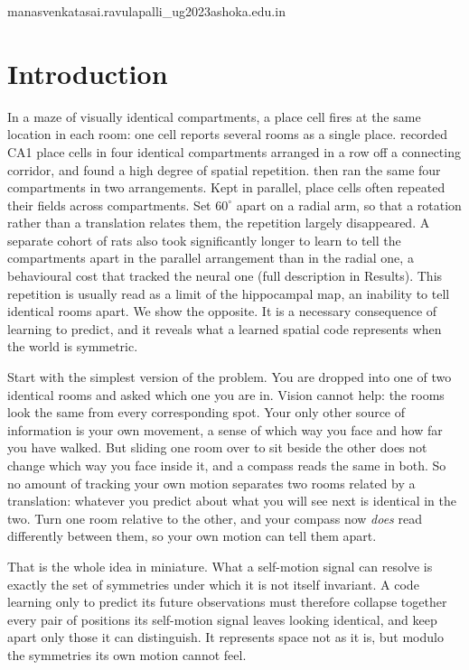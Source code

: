 \begin{corrauthor}
manasvenkatasai.ravulapalli\_ug2023\at ashoka.edu.in
\end{corrauthor}

\section*{Introduction}

In a maze of visually identical compartments, a place cell fires at the same location in each room:
one cell reports several rooms as a single place. \citet{spiers2015} recorded CA1 place cells in
four identical compartments arranged in a row off a connecting corridor, and found a high degree of
spatial repetition. \citet{grieves2016} then ran the same four compartments in two arrangements.
Kept in parallel, place cells often repeated their fields across compartments. Set $60^\circ$ apart
on a radial arm, so that a rotation rather than a translation relates them, the repetition largely
disappeared. A separate cohort of rats also took significantly longer to learn to tell the
compartments apart in the parallel arrangement than in the radial one, a behavioural cost that tracked
the neural one (full description in Results). This repetition is usually read as a limit of the
hippocampal map, an inability to tell identical rooms apart. We show the opposite. It is a necessary
consequence of learning to predict, and it reveals what a learned spatial code represents when the
world is symmetric.

Start with the simplest version of the problem. You are dropped into one of two identical rooms and
asked which one you are in. Vision cannot help: the rooms look the same from every corresponding spot.
Your only other source of information is your own movement, a sense of which way you face and how far
you have walked. But sliding one room over to sit beside the other does not change which way you face
inside it, and a compass reads the same in both. So no amount of tracking your own motion separates
two rooms related by a translation: whatever you predict about what you will see next is identical in
the two. Turn one room relative to the other, and your compass now \emph{does} read differently
between them, so your own motion can tell them apart.

That is the whole idea in miniature. What a self-motion signal can resolve is exactly the set of
symmetries under which it is not itself invariant. A code learning only to predict its future
observations must therefore collapse together every pair of positions its self-motion signal leaves
looking identical, and keep apart only those it can distinguish. It represents space not as it is, but
modulo the symmetries its own motion cannot feel.

